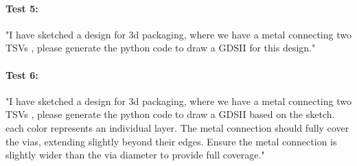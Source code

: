 \documentclass{article}
\begin{document}
\paragraph{Test 5:} "I have sketched a design for 3d packaging, where we have a metal connecting two TSVs , please generate the python code to draw a GDSII for this design."

\paragraph{Test 6:} "I have sketched a design for 3d packaging, where we have a metal connecting two TSVs , please generate the python code to draw a GDSII based on the sketch. each color represents an individual layer. The metal connection should fully cover the vias, extending slightly beyond their edges. Ensure the metal connection is slightly wider than the via diameter to provide full coverage."


\end{document}
